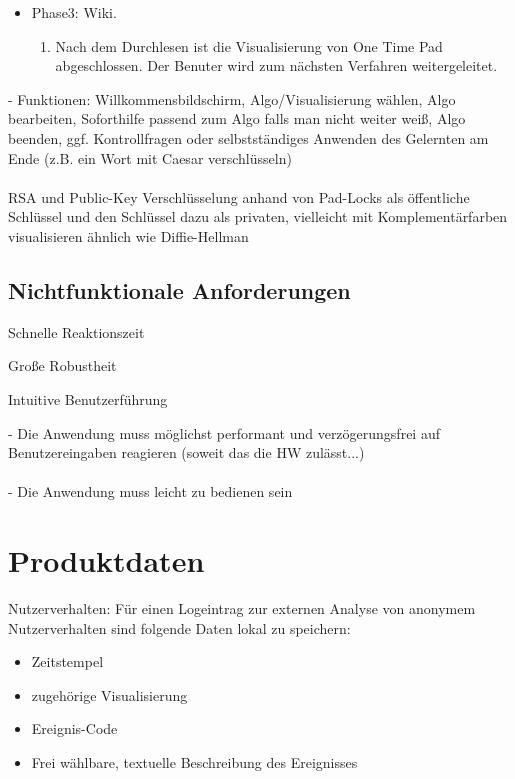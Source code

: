 \documentclass{article}
\begin{document}
\begin{itemize}[label={}]
\item Phase3: Wiki.
\begin{enumerate}
\item Nach dem Durchlesen ist die Visualisierung von One Time Pad abgeschlossen. Der Benuter wird zum nächsten Verfahren weitergeleitet.
\end{enumerate}
\end{itemize}

- Funktionen: Willkommensbildschirm, Algo/Visualisierung wählen, Algo bearbeiten, 
Soforthilfe passend zum Algo falls man nicht weiter weiß, Algo beenden, 
ggf. Kontrollfragen oder selbstständiges Anwenden des Gelernten am Ende (z.B. ein Wort mit Caesar verschlüsseln)
\\
\\
RSA und Public-Key Verschlüsselung anhand von Pad-Locks als 
öffentliche Schlüssel und den Schlüssel  dazu als privaten,
vielleicht mit Komplementärfarben visualisieren ähnlich wie Diffie-Hellman



\subsection{Nichtfunktionale Anforderungen}

\begin{NA}[start=100]
\item Schnelle Reaktionszeit
\end{NA}
\begin{NA}[start=200]
\item Große Robustheit
\end{NA}
\begin{NA}[start=300]
\item Intuitive Benutzerführung
\end{NA}

- Die Anwendung muss möglichst performant und verzögerungsfrei auf Benutzereingaben reagieren (soweit das die HW zulässt...)
\\
\\
- Die Anwendung muss leicht zu bedienen sein

\section{Produktdaten}
\begin{PD}[start=10]
  \item Nutzerverhalten: Für einen Logeintrag zur externen Analyse von anonymem Nutzerverhalten sind folgende Daten lokal zu speichern:
  \begin{itemize}
    \item Zeitstempel
    \item zugehörige Visualisierung
    \item Ereignis-Code
    \item Frei wählbare, textuelle Beschreibung des Ereignisses
  \end{itemize}
\end{PD}
\end{document}
